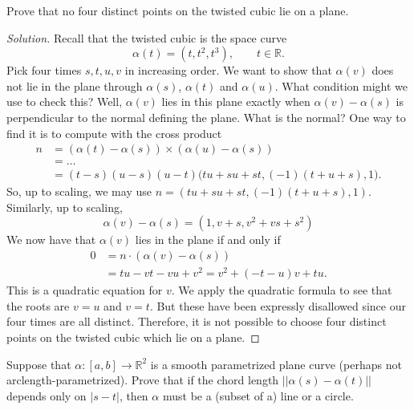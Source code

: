 \documentclass[Shifrin_Solutions_Spring_2015]{subfiles}
\begin{document}
\vspace{.5cm}


\begin{exercise}
Prove that no four distinct points on the twisted cubic lie on a plane.
\end{exercise}

\begin{proof}[Solution]
Recall that the twisted cubic is the space curve
\[
\alpha(t) = (t,t^2, t^3), \qquad t \in \mathbb{R}.
\]
Pick four times $s,t,u,v$ in increasing order. We want to show that $\alpha(v)$ does not lie in the plane through $\alpha(s)$, $\alpha(t)$ and $\alpha(u)$. What condition might we use to check this?
Well, $\alpha(v)$ lies in this plane exactly when $\alpha(v)-\alpha(s)$ is perpendicular to the normal defining the plane. What is the normal? One way to find it is to compute with the cross product
\[
\begin{split}
n & = (\alpha(t)-\alpha(s)) \times (\alpha(u)-\alpha(s)) \\
	& = \dots \\
	& = (t-s)(u-s)(u-t) \Big( tu + su + st , (-1)(t + u + s) , 1 \Big) .
\end{split}
\]
So, up to scaling, we may use $n = ( tu + su + st, (-1)(t+u+s), 1) $. Similarly, up to scaling,
\[
\alpha(v) - \alpha(s) = (1, v+s , v^2 + vs + s^2 )
\]
We now have that $\alpha(v)$ lies in the plane if and only if
\[
\begin{split}
0 & = n \cdot (\alpha(v) - \alpha(s) ) \\
	& = tu - vt - vu + v^2   = v^2 + (-t-u) v + tu .
\end{split}
\]
This is a quadratic equation for $v$. We apply the quadratic formula to see that the roots are  $v = u$ and $v= t$. But these have been expressly disallowed since our four times are all distinct. Therefore, it is not possible to choose four distinct points on the twisted cubic which lie on a plane.
\end{proof}


\vfill
\pagebreak



\begin{exercise}
Suppose that $\alpha:[a,b]\rightarrow \mathbb{R}^2$ is a smooth parametrized plane curve (perhaps not arclength-parametrized). Prove that if the chord length $||\alpha(s) - \alpha(t) ||$ depends only on $|s-t|$, then $\alpha$ must be a (subset of a) line or a circle.
\end{exercise}
\end{document}
